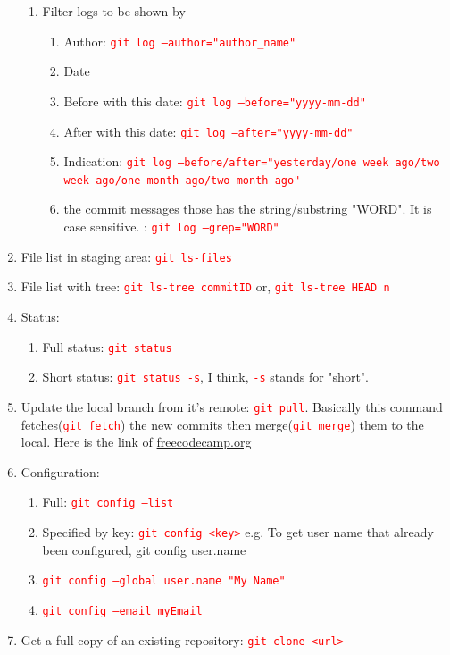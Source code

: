 \documentclass[12 pt, letterpaper]{extarticle}
\newcommand{\R}{\textcolor{red}} %
\newcommand{\T}{\texttt}
\begin{document}
\begin{enumerate}
\begin{enumerate}
			\item Filter logs to be shown by
				\begin{enumerate}
					\item Author: \R{\T{git log --author="author\_name"}}
					\item Date
					\item Before with this date: \R{\T{git log --before="yyyy-mm-dd"}}
					\item After with this date: \R{\T{git log --after="yyyy-mm-dd"}}
					\item Indication: \R{\T{git log --before/after="yesterday/one week ago/two week ago/one month ago/two month ago"}}
					\item the commit messages those has the string/substring "WORD". It is case sensitive. : \R{\T{git log --grep="WORD"}}
				\end{enumerate}
		\end{enumerate}
	\item File list in staging area: \R{\T{git ls-files}}
	\item File list with tree: \R{\T{git ls-tree commitID}}	or, \R{\T{git ls-tree HEAD~n}}
	
	\item Status:
		\begin{enumerate}
			\item Full status: \R{\T{git status}}
			\item Short status: \R{\T{git status -s}}, I think, \R{\T{-s}} stands for "short".
		\end{enumerate}
		
	\item Update the local branch from it's remote: \R{\T{git pull}}. Basically this command fetches(\R{\T{git fetch}}) the new commits then merge(\R{\T{git merge}}) them to the local. Here is the link of \href{https://www.freecodecamp.org/news/git-pull-explained/#:~:text=git\%20pull\%20is\%20a\%20Git,a\%20repository\%20from\%20a\%20remote.&text=By\%20default\%2C\%20git\%20pull\%20does,branches\%20for\%20all\%20other\%20branches.}{freecodecamp.org}
		
	\item Configuration:
		\begin{enumerate}
			\item Full: \R{\T{git config --list}}
			\item Specified by key: \R{\T{git config <key>}} e.g. To get user name that already been configured, \textcolor{red!70}{{git config user.name}}
			\item \R{\T{git config --global user.name "My Name"}}
			\item \R{\T{git config --email myEmail}}
		\end{enumerate}
	\item Get a full copy of an existing repository: \R{\T{git clone <url>}}
	

\end{enumerate}
\end{document}
